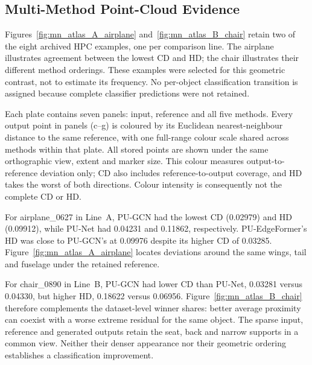 \subsection{Multi-Method Point-Cloud Evidence}
\label{sec:modelnet-visual}

Figures~\ref{fig:mn_atlas_A_airplane} and~\ref{fig:mn_atlas_B_chair}
retain two of the eight archived HPC examples, one per comparison line.
The airplane illustrates agreement between the lowest CD and HD;
the chair illustrates their different method orderings. These examples
were selected for this geometric contrast, not to estimate its frequency.
No per-object classification transition is assigned because complete
classifier predictions were not retained.

Each plate contains seven panels: input, reference and all five methods.
Every output point in panels (c--g) is coloured by its Euclidean
nearest-neighbour distance to the same reference, with one full-range
colour scale shared across methods within that plate. All stored points
are shown under the same orthographic view, extent and marker size.
This colour measures output-to-reference deviation only; CD also
includes reference-to-output coverage, and HD takes the worst of both
directions. Colour intensity is consequently not the complete CD or HD.

For airplane\_0627 in Line~A, PU-GCN had the lowest CD (0.02979) and
HD (0.09912), while PU-Net had 0.04231 and 0.11862, respectively.
PU-EdgeFormer's HD was close to PU-GCN's at 0.09976 despite its higher
CD of 0.03285. Figure~\ref{fig:mn_atlas_A_airplane} locates deviations
around the same wings, tail and fuselage under the retained reference.


For chair\_0890 in Line~B, PU-GCN had lower CD than PU-Net, 0.03281
versus 0.04330, but higher HD, 0.18622 versus 0.06956.
Figure~\ref{fig:mn_atlas_B_chair} therefore complements the dataset-level
winner shares: better average proximity can coexist with a worse
extreme residual for the same object. The sparse input, reference and
generated outputs retain the seat, back and narrow supports in a
common view. Neither their denser appearance nor their geometric
ordering establishes a classification improvement.

\FloatBarrier
